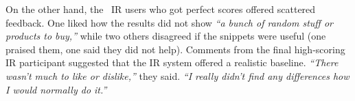 On the other hand, the \irNperfectscore~IR users who got perfect scores offered scattered feedback. One liked how the results did not show \textit{``a bunch of random stuff or products to buy,''} while two others disagreed if the snippets were useful (one praised them, one said they did not help). 
Comments from the final high-scoring IR participant suggested that the IR system offered a realistic baseline. 
\textit{``There wasn't much to like or dislike,''} they said. \textit{``I really didn't find any differences how I would normally do it.''}
